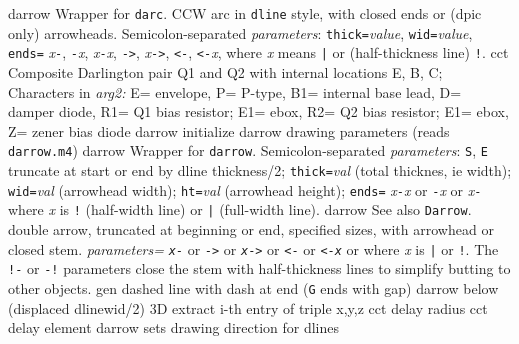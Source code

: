   {darrow}
  {Wrapper for {\tt darc}.
   CCW arc in {\tt dline} style, with closed ends or (dpic only) arrowheads.
  Semicolon-separated {\sl parameters}:
  {\tt thick=}{\sl value}, {\tt wid=}{\sl value}, {\tt ends=}
  {\sl x}{\tt -},
  {\tt -}{\sl x}, {\sl x}{\tt -}{\sl x}, {\tt ->}, {\sl x}{\tt ->},
  {\tt <-}, {\tt <-}{\sl x}, {\tt <->}
  where {\sl x} means {\tt |} or (half-thickness line) {\tt !}.}
  {cct}
  {Composite Darlington pair Q1 and Q2 with internal locations E, B, C;
   Characters in {\sl arg2:}
   E= envelope,
   P= P-type,
   B1= internal base lead,
   D= damper diode,
   R1= Q1 bias resistor; E1= ebox,
   R2= Q2 bias resistor; E1= ebox,
   Z= zener bias diode 
    }
  {darrow}
  {initialize darrow drawing parameters (reads {\tt darrow.m4})}
  {darrow}
  {Wrapper for {\tt darrow}.
  Semicolon-separated {\sl parameters}:
    {\tt S}, {\tt E} truncate at start or end by dline thickness/2;
    {\tt thick=}{\sl val}   (total thicknes, ie width);
    {\tt wid=}{\sl val}     (arrowhead width);
    {\tt ht=}{\sl val}      (arrowhead height);
    {\tt ends=}
      {\sl x}{\tt -}{\sl x} or
      {\tt -}{\sl x} or
      {\sl x}{\tt -} where {\sl x} is {\tt !} (half-width line)
       or {\tt |} (full-width line).}
  {darrow}
  {See also {\tt Darrow}.
   double arrow, truncated at beginning or end, specified sizes,
    with arrowhead or closed stem.
    {\sl parameters=}
    {\tt {\sl x}-} or {\tt ->} or {\tt {\sl x}->} or {\tt <-} or {\tt <-{\sl x}}
    or {\tt <->} where {\sl x} is {\tt |} or {\tt !}.
    The {\tt !-} or {\tt -!} parameters close
    the stem with half-thickness lines to simplify butting to other objects. }
  {gen}
  {dashed line with dash at end ({\tt G} ends with gap)}
  {darrow}
  {below (displaced dlinewid/2)}
  {3D}
  {extract i-th entry of triple x,y,z}
  {cct}
  {delay radius}
  {cct}
  {delay element}
  {darrow}
  {sets drawing direction for dlines}
